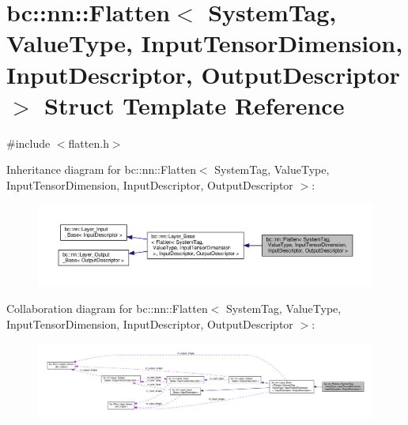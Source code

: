 \hypertarget{structbc_1_1nn_1_1Flatten}{}\section{bc\+:\+:nn\+:\+:Flatten$<$ System\+Tag, Value\+Type, Input\+Tensor\+Dimension, Input\+Descriptor, Output\+Descriptor $>$ Struct Template Reference}
\label{structbc_1_1nn_1_1Flatten}


{\ttfamily \#include $<$flatten.\+h$>$}



Inheritance diagram for bc\+:\+:nn\+:\+:Flatten$<$ System\+Tag, Value\+Type, Input\+Tensor\+Dimension, Input\+Descriptor, Output\+Descriptor $>$\+:\nopagebreak
\begin{figure}[H]
\begin{center}
\leavevmode
\includegraphics[width=350pt]{structbc_1_1nn_1_1Flatten__inherit__graph}
\end{center}
\end{figure}


Collaboration diagram for bc\+:\+:nn\+:\+:Flatten$<$ System\+Tag, Value\+Type, Input\+Tensor\+Dimension, Input\+Descriptor, Output\+Descriptor $>$\+:\nopagebreak
\begin{figure}[H]
\begin{center}
\leavevmode
\includegraphics[width=350pt]{structbc_1_1nn_1_1Flatten__coll__graph}
\end{center}
\end{figure}
